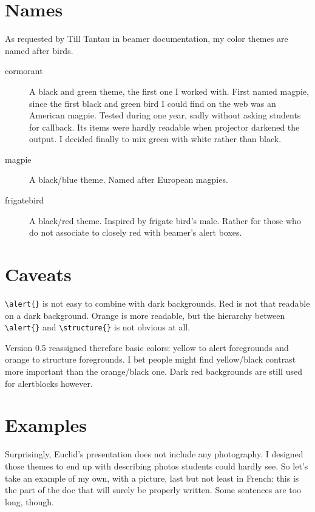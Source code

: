 \documentclass[12pt]{article}
\begin{document}
\section{Names}

As requested by Till Tantau in \ttfamily{}beamer\rmfamily{} documentation, my color themes are named after birds.

\begin{description}
\item[cormorant]
A black and green theme, the first one I worked with. First named magpie, since the first black and green bird I could find on the web was an American magpie. 
Tested during one year, sadly without asking students for callback. Its items were hardly readable when projector darkened the output. I decided finally to mix green with white rather than black. 

\item[magpie]
A black/blue theme. Named after European magpies.

\item[frigatebird]
A black/red theme. Inspired by frigate bird's male. Rather for those who do not associate to closely red with beamer's alert boxes. 
\end{description}

\section{Caveats}

\verb+\alert{}+ is not easy to combine with dark backgrounds. Red is not that readable on a dark background. Orange is more readable, but the hierarchy between \verb+\alert{}+ and \verb+\structure{}+ is not obvious at all.

Version 0.5 reassigned therefore basic colors: yellow to \ttfamily{}alert\rmfamily{} foregrounds and orange to \ttfamily{}structure\rmfamily{} foregrounds. I bet people might find yellow/black contrast more important than the orange/black one. Dark red backgrounds are still used for alertblocks however.

\section{Examples}

Surprisingly, Euclid's presentation does not include any photography. I designed those themes to end up with describing photos students could hardly see. So let's take an example of my own, with a picture, last but not least in French: this is the part of the doc that will surely be properly written.
Some sentences are too long, though.
\end{document}
